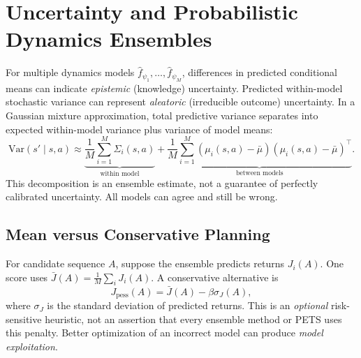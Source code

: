 \section{Uncertainty and Probabilistic Dynamics Ensembles}
For multiple dynamics models $\hat f_{\psi_1},\ldots,\hat f_{\psi_M}$, differences in predicted conditional means can indicate \emph{epistemic} (knowledge) uncertainty. Predicted within-model stochastic variance can represent \emph{aleatoric} (irreducible outcome) uncertainty. In a Gaussian mixture approximation, total predictive variance separates into expected within-model variance plus variance of model means:
\begin{equation}
\mathrm{Var}(s'\mid s,a)\approx
\underbrace{\frac1M\sum_{i=1}^M\Sigma_i(s,a)}_{\text{within model}}
+
\underbrace{\frac1M\sum_{i=1}^M
(\mu_i(s,a)-\bar\mu)(\mu_i(s,a)-\bar\mu)^\top}_{\text{between models}}.
\end{equation}
This decomposition is an ensemble estimate, not a guarantee of perfectly calibrated uncertainty. All models can agree and still be wrong.

\subsection{Mean versus Conservative Planning}
For candidate sequence $A$, suppose the ensemble predicts returns $J_i(A)$. One score uses $\bar J(A)=\frac1M\sum_iJ_i(A)$. A conservative alternative is
\begin{equation}
J_{\mathrm{pess}}(A)=\bar J(A)-\beta\sigma_J(A),
\end{equation}
where $\sigma_J$ is the standard deviation of predicted returns. This is an \emph{optional} risk-sensitive heuristic, not an assertion that every ensemble method or PETS uses this penalty. Better optimization of an incorrect model can produce \emph{model exploitation}.

